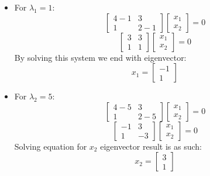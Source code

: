 \begin{itemize}
    \item For $\lambda_1 = 1$:
        \begin{equation*}
            \begin{bmatrix}
                4 - 1 & 3 \\
                1 & 2 - 1
            \end{bmatrix}
            \begin{bmatrix}
                x_1 \\
                x_2
            \end{bmatrix} = 0
        \end{equation*}
        \begin{equation*}
            \begin{bmatrix}
                3 & 3 \\
                1 & 1
            \end{bmatrix}
            \begin{bmatrix}
                x_1 \\
                x_2
            \end{bmatrix} = 0
        \end{equation*}
        By solving this system we end with eigenvector:
        \begin{equation*}
            x_1 = 
            \begin{bmatrix}
                -1 \\
                1
            \end{bmatrix} 
        \end{equation*} 
    \item For $\lambda_2 = 5$:
    \begin{equation*}
        \begin{bmatrix}
            4 - 5 & 3 \\
            1 & 2 - 5
        \end{bmatrix}
        \begin{bmatrix}
            x_1 \\
            x_2
        \end{bmatrix} = 0
    \end{equation*}
    \begin{equation*}
        \begin{bmatrix}
            -1 & 3 \\
            1 & -3
        \end{bmatrix}
        \begin{bmatrix}
            x_1 \\
            x_2
        \end{bmatrix} = 0
    \end{equation*}
    Solving equation for $x_2$ eigenvector result is as such:
    \begin{equation*}
        x_2 = 
        \begin{bmatrix}
            3 \\
            1
        \end{bmatrix} 
    \end{equation*} 
\end{itemize}

